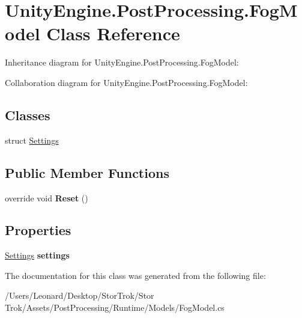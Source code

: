 \hypertarget{class_unity_engine_1_1_post_processing_1_1_fog_model}{}\section{Unity\+Engine.\+Post\+Processing.\+Fog\+Model Class Reference}
\label{class_unity_engine_1_1_post_processing_1_1_fog_model}


Inheritance diagram for Unity\+Engine.\+Post\+Processing.\+Fog\+Model\+:


Collaboration diagram for Unity\+Engine.\+Post\+Processing.\+Fog\+Model\+:
\subsection*{Classes}
\begin{DoxyCompactItemize}
\item 
struct \hyperlink{struct_unity_engine_1_1_post_processing_1_1_fog_model_1_1_settings}{Settings}
\end{DoxyCompactItemize}
\subsection*{Public Member Functions}
\begin{DoxyCompactItemize}
\item 
\mbox{\label{class_unity_engine_1_1_post_processing_1_1_fog_model_ac02075eb4d6e2eaa462eb33ab53c4753}} 
override void {\bfseries Reset} ()
\end{DoxyCompactItemize}
\subsection*{Properties}
\begin{DoxyCompactItemize}
\item 
\mbox{\label{class_unity_engine_1_1_post_processing_1_1_fog_model_a2c7449e70d9d2940455a8fe97644c112}} 
\hyperlink{struct_unity_engine_1_1_post_processing_1_1_fog_model_1_1_settings}{Settings} {\bfseries settings}
\end{DoxyCompactItemize}


The documentation for this class was generated from the following file\+:\begin{DoxyCompactItemize}
\item 
/\+Users/\+Leonard/\+Desktop/\+Stor\+Trok/\+Stor Trok/\+Assets/\+Post\+Processing/\+Runtime/\+Models/Fog\+Model.\+cs\end{DoxyCompactItemize}
